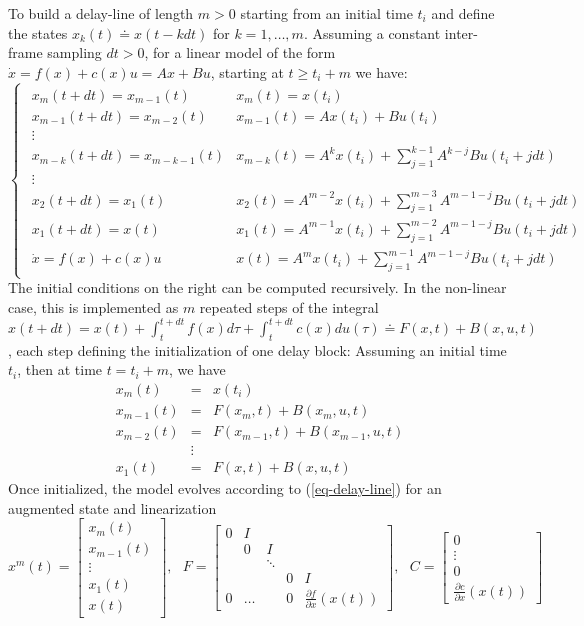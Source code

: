 \documentclass[]{article}
\newcommand{\ba}{\left[ \begin{array}}
\newcommand{\ea}{\end{array} \right]}
\newcommand{\bc}{\begin{cases}}
\newcommand{\ec}{\end{cases}}
\begin{document}
To build a delay-line of length $m>0$ starting from an initial time $t_i$ and define the states $x_k(t) \doteq x(t-k dt)$ for $k = 1, \dots, m$. Assuming a constant inter-frame sampling $dt >0$, for a linear model of the form $\dot x = f(x) + c(x) u = A x + B u$, starting at $t \ge t_i+m$ we have:
\begin{equation}
\bc
\begin{array}{ll}
x_m(t+dt) = x_{m-1}(t) & x_m(t) = x(t_i) \\
x_{m-1}(t+dt) = x_{m-2}(t) &  x_{m-1}(t) = A x(t_i) + B u(t_i) \\
\vdots & \\
x_{m-k}(t+dt) = x_{m-k-1}(t) & x_{m-k}(t) = A^kx(t_i) + \sum_{j = 1}^{k-1} A^{k-j} B  u(t_i+ j dt) \\
\vdots & \\
x_2(t+dt) = x_1(t) & x_{2}(t) = A^{m-2}x(t_i) + \sum_{j = 1}^{m-3} A^{m-1-j} B  u(t_i+ j dt)\\
x_1(t+dt) = x(t) &  x_{1}(t) = A^{m-1}x(t_i) + \sum_{j = 1}^{m-2} A^{m-1-j} B  u(t_i+ j dt) \\
\dot x = f(x) + c(x) u & x(t) = A^{m}x(t_i) + \sum_{j = 1}^{m-1} A^{m-1-j} B  u(t_i+ j dt) 
\end{array}
\ec
\label{eq-delay-line}
\end{equation} 
The initial conditions on the right can be computed recursively. In the non-linear case, this is implemented as $m$ repeated steps of the integral $x(t+dt) = x(t) + \int_{t}^{t+dt} f(x)d\tau + \int_{t}^{t+dt} c(x)du(\tau) \doteq F(x,t) + B(x,u,t)$, each step defining the initialization of one delay block:
Assuming an initial time $t_i$, then at time $t = t_i + m$, we have
\begin{eqnarray}
x_m(t) &=& x(t_i) \\
x_{m-1}(t) &=& F(x_m, t) + B(x_m, u, t)  \\ 
x_{m-2}(t) &=& F(x_{m-1}, t) + B(x_{m-1}, u, t) \\
& \vdots & \\
x_{1}(t) &=& F(x,t) + B(x,u,t) 
\end{eqnarray}
Once initialized, the model evolves according to (\ref{eq-delay-line}) for an augmented state and linearization
\begin{equation}
x^m(t) = \ba{c}
x_m(t) \\
x_{m-1}(t) \\
\vdots \\
x_1(t)\\
x(t)
\ea, ~~~
F = \ba{ccccc}
0 & I & & & \\
  & 0 & I & &  \\
  &   &   \ddots  & &   \\
  &   &           & 0 & I \\
0 &   \dots &           & 0  & \frac{\partial f}{\partial x}(x(t))
\ea, ~~~
C = \ba{c}
0 \\ \vdots \\ 0 \\ \frac{\partial c}{\partial x}(x(t))
\ea
\end{equation}
\end{document}
